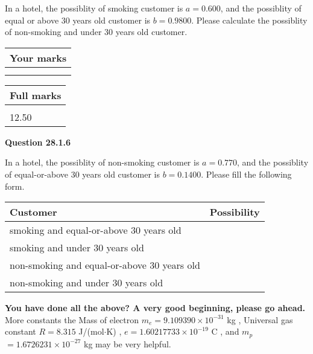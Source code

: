 \documentclass[12pt]{article}
\begin{document}
  
In a hotel, the possiblity of  %
smoking customer is
$a =  %
0.600$, and the possiblity of  %
equal or above 30 years old customer is $ b =  %
0.9800$.
Please calculate the possiblity of  %
 non-smoking and  %
under 30 years old customer.
 

 

 
\vspace{0.3in}
  
\vspace{0.2in}
  
         \begin{tabular}{|l|}
\hline
 Your marks  \\
\hline
 \\ 
 \\ 
\hline
\end{tabular}
\hspace{0.05in} \begin{tabular}{|l|}
\hline
 Full marks  \\
\hline
 \\ 
12.50 \\
\hline
\end{tabular}
{\textbf{\Large{Question
28.1.6 
}}}
  
  
In a hotel, the possiblity of  %
non-smoking customer is
$a =  %
0.770$, and the possiblity of  %
equal-or-above 30 years old customer is $ b =  %
0.1400$.
Please fill the following form.
 
\noindent
\begin{tabular}{|l|l|}
\hline
Customer & Possibility \\
\hline
smoking  and   %
equal-or-above 30 years old  & \\
\hline
smoking  and   %
under 30 years old & \\
\hline
 non-smoking and   %
equal-or-above 30 years old  & \\
\hline
 non-smoking and  %
under 30 years old & \\
\hline
\end{tabular}
 
 
 

 

 
\vspace{0.3in}
   
   
\vspace{0.3in}
{\textbf{\LARGE{You have done all the above? A very good beginning, please go ahead.}}}
More constants the
Mass of electron
$m_e$$ =
9.109390 \times 10^{-31} $
kg
,
Universal gas constant
$R$$ =
8.315 $
J/(mol$\cdot $K)
,
$e$$ =
1.60217733 \times 10^{-19} $
C
, and
$m_p$$ =
1.6726231 \times 10^{-27} $
kg
%
may be very helpful.
\vspace{0.3in}
   
\end{document}
